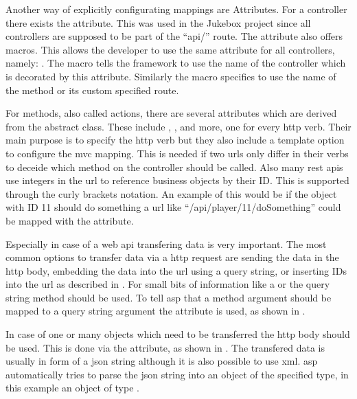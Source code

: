 Another way of explicitly configurating mappings are Attributes. For a controller there exists the \lstcode{[Route]} attribute. This was used in the Jukebox project since all controllers are supposed to be part of the \enquote{api/} route. The \lstcode{[Route]} attribute also offers macros. This allows the developer to use the same attribute for all controllers, namely: . The \lstcode{[controller]} macro tells the framework to use the name of the controller which is decorated by this attribute. Similarly the \lstcode{[action]} macro specifies to use the name of the method or its custom specified route.

For methods, also called actions, there are several attributes which are derived from the abstract  class. These include \lstcode{[HttpPost]}, \lstcode{[HttpGet]}, and more, one for every \gls{http} verb. Their main purpose is to specify the \gls{http} verb but they also include a template option to configure the \gls{mvc} mapping. This is needed if two \gls{url}s only differ in their verbs to deceide which method on the controller should be called. Also many \gls{rest} \gls{api}s use integers in the \gls{url} to reference business objects by their ID. This is supported through the curly brackets notation. An example of this would be if the  object with ID 11 should do something a \gls{url} like \enquote{/api/player/11/doSomething} could be mapped with the  attribute.


Especially in case of a web \gls{api} transfering data is very important. The most common options to transfer data via a \gls{http} request are sending the data in the \gls{http} body, embedding the data into the \gls{url} using a query string, or inserting IDs into the \gls{url} as described in . For small bits of information like a  or  the query string method should be used. To tell \gls{asp} that a method argument should be mapped to a query string argument the \lstcode{[FromQuery]} attribute is used, as shown in .

In case of one or many objects which need to be transferred the \gls{http} body should be used. This is done via the \lstcode{[FromBody]} attribute, as shown in . The transfered data is usually in form of a \gls{json} string although it is also possible to use \gls{xml}. \gls{asp} automatically tries to parse the \gls{json} string into an object of the specified type, in this example an object of type .

